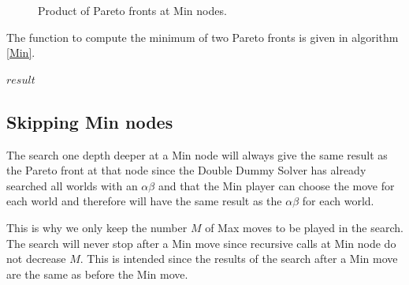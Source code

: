 \documentclass{ecai}
\begin{document}
\begin{figure}
  \centering
  \caption{Product of Pareto fronts at Min nodes.}
  \label{figureProduct}
\end{figure}

The function to compute the minimum of two Pareto fronts is given in
algorithm \ref{Min}.


\begin{algorithm}
\begin{algorithmic}[1]
\begin{ALC@g}
\ELSE
{}
\ENDIF
\ENDFOR
{}
\ENDIF
\ENDFOR
\ENDFOR
\RETURN $result$
\end{ALC@g}
\end{algorithmic}
\caption{\label{Min}The function for joining two Pareto fronts at Min nodes.}
\end{algorithm}

\subsection{Skipping Min nodes}

The search one depth deeper at a Min node will always give the same
result as the Pareto front at that node since the Double Dummy Solver
has already searched all worlds with an $\alpha\beta$ and that the Min
player can choose the move for each world and therefore will have the
same result as the $\alpha\beta$ for each world.

This is why we only keep the number $M$ of Max moves to be played in
the search. The search will never stop after a Min move since
recursive calls at Min node do not decrease $M$. This is intended
since the results of the search after a Min move are the same as
before the Min move.
\end{document}
